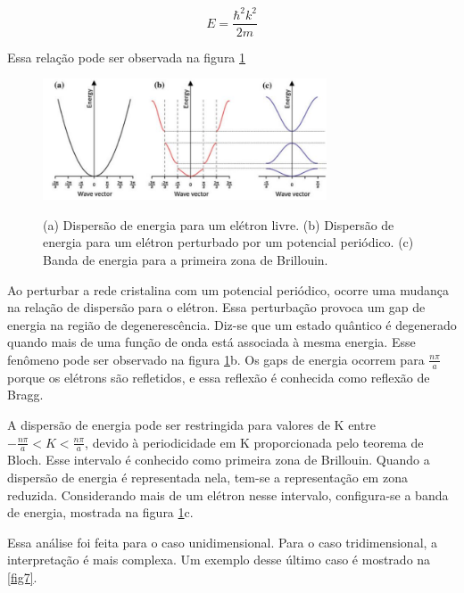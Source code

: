 		\begin{equation}\label{eq_schrodinger_autovalores_rewrote}
	        E = \frac{\hbar^2 k^2}{2m}
	  	\end{equation}

	  	\par Essa relação pode ser observada na figura \ref{fig6}

	  	\begin{figure}[H]
	      \caption{(a) Dispersão de energia para um elétron livre. (b) Dispersão de energia para um elétron perturbado por um potencial periódico. (c) Banda de energia para a primeira zona de Brillouin.}
	      \centering
	      \includegraphics[width=0.75\textwidth]{images/figura6.jpg}
	      \label{fig6}
	    \end{figure}

	  	\par Ao perturbar a rede cristalina com um potencial periódico, ocorre uma mudança na relação de dispersão para o elétron. Essa perturbação provoca um gap de energia na região de degenerescência. Diz-se que um estado quântico é degenerado quando mais de uma função de onda está associada à mesma energia. Esse fenômeno pode ser observado na figura \ref{fig6}b. Os gaps de energia ocorrem para $\frac{n\pi}{a}$ porque os elétrons são refletidos, e essa reflexão é conhecida como reflexão de Bragg.

	  	\par A dispersão de energia pode ser restringida para valores de K entre $-\frac{n\pi}{a} < K < \frac{n\pi}{a}$, devido à periodicidade em K proporcionada pelo teorema de Bloch. Esse intervalo é conhecido como primeira zona de Brillouin. Quando a dispersão de energia é representada nela, tem-se a representação em zona reduzida. Considerando mais de um elétron nesse intervalo, configura-se a banda de energia, mostrada na figura \ref{fig6}c.

		\par Essa análise foi feita para o caso unidimensional. Para o caso tridimensional, a interpretação é mais complexa. Um exemplo desse último caso é mostrado na \ref{fig7}.


